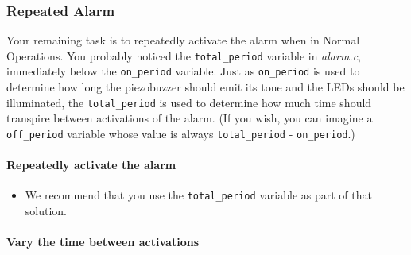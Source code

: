 \subsubsection{Repeated Alarm} \label{subsubsec:repeatedAlarm}

Your remaining task is to repeatedly activate the alarm when in Normal Operations.
You probably noticed the \lstinline{total_period} variable in \textit{alarm.c}, immediately below the \lstinline{on_period} variable.
Just as \lstinline{on_period} is used to determine how long the piezobuzzer should emit its tone and the LEDs should be illuminated, the \lstinline{total_period} is used to determine how much time should transpire between activations of the alarm.
(If you wish, you can imagine a \lstinline{off_period} variable whose value is always \lstinline{total_period} - \lstinline{on_period}.)

\paragraph{Repeatedly activate the alarm}
\begin{description}
        \begin{itemize}
            \item We recommend that you use the \lstinline{total_period} variable as part of that solution.
        \end{itemize}
\end{description}
\paragraph{Vary the time between activations}
\begin{description}
\end{description}
